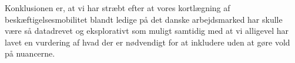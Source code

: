 \label{ledighedsrisiko} %












Konklusionen er, at vi har stræbt efter at vores kortlægning af beskæftigelsesmobilitet blandt ledige på det danske arbejdsmarked har skulle være så datadrevet og eksplorativt som muligt samtidig med at vi alligevel har lavet en vurdering af hvad der er nødvendigt for at inkludere uden at gøre vold på nuancerne.









